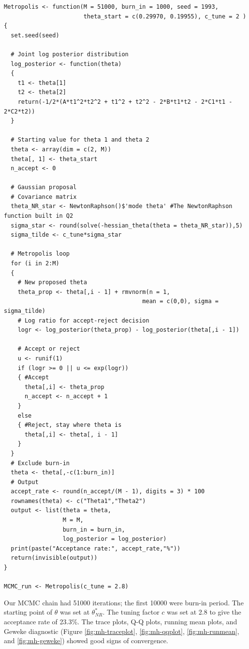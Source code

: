 \documentclass[12pt]{article}
\begin{document}
\begin{lstlisting}
Metropolis <- function(M = 51000, burn_in = 1000, seed = 1993, 
                       theta_start = c(0.29970, 0.19955), c_tune = 2 )
{
  set.seed(seed)
  
  # Joint log posterior distribution
  log_posterior <- function(theta)
  {
    t1 <- theta[1]
    t2 <- theta[2]
    return(-1/2*(A*t1^2*t2^2 + t1^2 + t2^2 - 2*B*t1*t2 - 2*C1*t1 - 2*C2*t2))
  }
  
  # Starting value for theta 1 and theta 2
  theta <- array(dim = c(2, M))
  theta[, 1] <- theta_start
  n_accept <- 0
  
  # Gaussian proposal
  # Covariance matrix
  theta_NR_star <- NewtonRaphson()$'mode theta' #The NewtonRaphson function built in Q2
  sigma_star <- round(solve(-hessian_theta(theta = theta_NR_star)),5)
  sigma_tilde <- c_tune*sigma_star
  
  # Metropolis loop
  for (i in 2:M)
  {
    # New proposed theta
    theta_prop <- theta[,i - 1] + rmvnorm(n = 1, 
                                        mean = c(0,0), sigma = sigma_tilde)
    # Log ratio for accept-reject decision
    logr <- log_posterior(theta_prop) - log_posterior(theta[,i - 1])
    
    # Accept or reject
    u <- runif(1)
    if (logr >= 0 || u <= exp(logr))
    { #Accept
      theta[,i] <- theta_prop
      n_accept <- n_accept + 1
    } 
    else 
    { #Reject, stay where theta is
      theta[,i] <- theta[, i - 1]
    }
  }
  # Exclude burn-in
  theta <- theta[,-c(1:burn_in)]
  # Output
  accept_rate <- round(n_accept/(M - 1), digits = 3) * 100
  rownames(theta) <- c("Theta1","Theta2")
  output <- list(theta = theta,
                 M = M, 
                 burn_in = burn_in,
                 log_posterior = log_posterior)
  print(paste("Acceptance rate:", accept_rate,"%"))
  return(invisible(output))
}

MCMC_run <- Metropolis(c_tune = 2.8)

\end{lstlisting}

Our MCMC chain had 51000 iterations; the first 10000 were burn-in period. The
starting point of \( \theta \) was set at \( \theta^*_{NR} \). The tuning factor \( c \) was set at 2.8 to give the acceptance
rate of 23.3\%. The trace plots, Q-Q plots, running mean plots, and Geweke diagnostic (Figure
\ref{fig:mh-traceplot}, \ref{fig:mh-qqplot}, \ref{fig:mh-runmean}, and \ref{fig:mh-geweke}) showed good signs of convergence.
\end{document}
